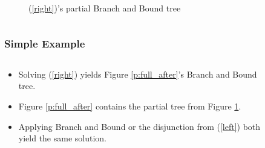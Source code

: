 \documentclass{beamer}
\begin{document}
\begin{frame}[t]
\begin{columns}[T]
\begin{column}{0.7\textwidth}
\begin{figure}[]
					\captionsetup{font=footnotesize,labelfont=footnotesize}
					\caption{(\ref{right})'s partial Branch and Bound tree}
					\label{p:partial_after}
				\end{figure}
			\end{column}
		\end{columns}
		\normalsize
	\end{frame}

	\begin{frame}[t]
		\frametitle{Simple Example}
		\footnotesize
		\begin{columns}[T]
			\begin{column}{0.3\textwidth}
				\begin{itemize}
					\item Solving (\ref{right}) yields Figure \ref{p:full_after}'s Branch and Bound tree.
					\item Figure \ref{p:full_after} contains the partial tree from Figure \ref{p:partial_after}.
					\item Applying Branch and Bound or the disjunction from (\ref{left}) both yield the same solution.
				\end{itemize}
			\end{column}
			\begin{column}{0.7\textwidth}
				\vspace{-.85cm}
				\begin{figure}[h]
\end{figure}
\end{column}
\end{columns}
\end{frame}
\end{document}
